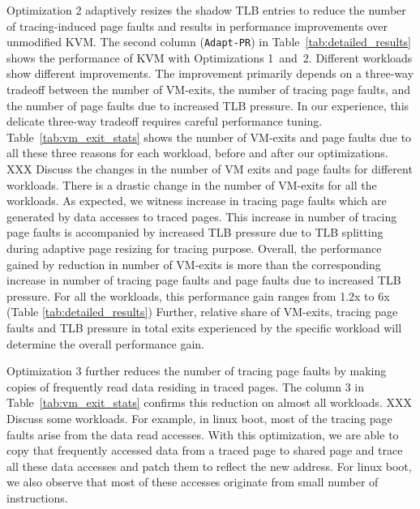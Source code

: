 \documentclass[10pt,twocolumn]{article}
\begin{document}
Optimization 2 adaptively resizes the shadow TLB entries to reduce
the number of tracing-induced page faults and results in
performance improvements over unmodified KVM. The second column ({\tt Adapt-PR})
in Table~\ref{tab:detailed_results} shows the performance of KVM with
Optimizations 1~and~2.
Different workloads show different improvements. The improvement primarily depends
on a three-way tradeoff between the number of VM-exits, the number of
tracing page faults, and the number of page faults due to increased TLB pressure.
In our experience, this delicate three-way tradeoff requires careful
performance tuning.
Table~\ref{tab:vm_exit_stats} shows the number of VM-exits and page faults due
to all these three reasons for each workload, before and after our optimizations.
XXX Discuss the changes in the number
of VM exits and page faults for different workloads.
There is a drastic change in the number of VM-exits for all the workloads. 
As expected, we witness increase in tracing page faults which are generated 
by data accesses to traced pages.
 This increase in number of tracing page faults is accompanied by increased TLB pressure
 due to TLB splitting during adaptive page resizing for tracing purpose.
 Overall, the performance gained by reduction in number of VM-exits is more than the corresponding increase in number of tracing page faults and page faults due to increased TLB pressure.
  For all the workloads, this performance gain ranges from 1.2x to 6x (Table \ref{tab:detailed_results})
  Further, relative share of VM-exits, tracing page faults and TLB pressure in total
   exits experienced by the specific workload will determine the overall performance gain.

   

Optimization 3 further reduces the number of tracing page faults by
making copies of frequently read data residing in traced pages. The column 3 in
Table~\ref{tab:vm_exit_stats} confirms this reduction on almost all workloads.
XXX Discuss some workloads. 
For example, in linux boot, most of the tracing page faults arise from the data read 
accesses. With this optimization, we are able to copy that frequently accessed data from
 a traced page to shared page and trace all these data accesses and patch them to reflect
 the new address.
For linux boot, we also observe that most of these accesses originate from small number of instructions. 
\end{document}
